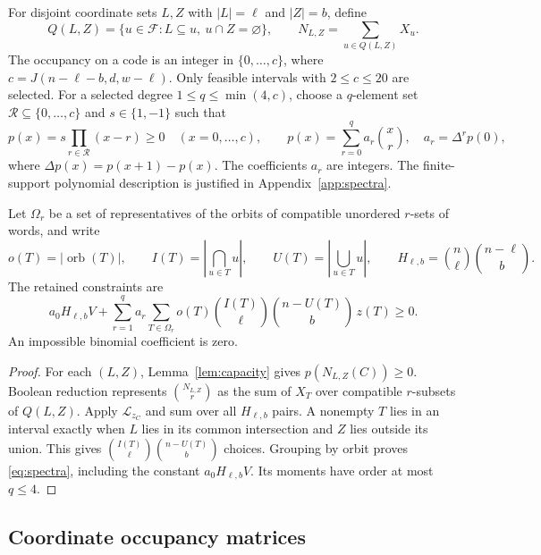 \documentclass[11pt]{article}
\newcommand{\F}{\mathcal F}
\newcommand{\Lzc}{\mathcal L_{z_C}}
\newcommand{\orb}{\operatorname{orb}}
\begin{document}
For disjoint coordinate sets $L,Z$ with $|L|=\ell$ and $|Z|=b$, define
\[
 Q(L,Z)=\{u\in\F:L\subseteq u,\ u\cap Z=\varnothing\},\qquad
 N_{L,Z}=\sum_{u\in Q(L,Z)}X_u.
\]
The occupancy on a code is an integer in $\{0,\ldots,c\}$, where
$c=J(n-\ell-b,d,w-\ell)$. Only feasible intervals with $2\le c\le20$ are
selected. For a selected degree $1\le q\le\min(4,c)$, choose a $q$-element
set $\mathcal R\subseteq\{0,\ldots,c\}$ and $s\in\{1,-1\}$ such that
\begin{equation}\label{eq:spectral-polynomial}
 p(x)=s\prod_{r\in\mathcal R}(x-r)\ge0\quad(x=0,\ldots,c),\qquad
 p(x)=\sum_{r=0}^q a_r\binom xr,\quad a_r=\Delta^rp(0),
\end{equation}
where $\Delta p(x)=p(x+1)-p(x)$. The coefficients $a_r$ are integers.
The finite-support polynomial description is justified in
Appendix~\ref{app:spectra}.

Let $\Omega_r$ be a set of representatives of the orbits of compatible
unordered $r$-sets of words, and write
\[
 o(T)=|\orb(T)|,\qquad I(T)=\left|\bigcap_{u\in T}u\right|,\qquad
 U(T)=\left|\bigcup_{u\in T}u\right|,\qquad
 H_{\ell,b}=\binom n\ell\binom{n-\ell}b.
\]
The retained constraints are
\begin{equation}\label{eq:spectra}
 a_0H_{\ell,b}V+
 \sum_{r=1}^q a_r\sum_{T\in\Omega_r}
 o(T)\binom{I(T)}\ell\binom{n-U(T)}b\,z(T)\ge0.
\end{equation}
An impossible binomial coefficient is zero.

\begin{proof}
For each $(L,Z)$, Lemma~\ref{lem:capacity} gives $p(N_{L,Z}(C))\ge0$.
Boolean reduction represents $\binom{N_{L,Z}}r$ as the sum of $X_T$ over
compatible $r$-subsets of $Q(L,Z)$. Apply $\Lzc$ and sum over all
$H_{\ell,b}$ pairs. A nonempty $T$ lies in an interval exactly when $L$ lies
in its common intersection and $Z$ lies outside its union. This gives
$\binom{I(T)}\ell\binom{n-U(T)}b$ choices. Grouping by orbit proves
\eqref{eq:spectra}, including the constant $a_0H_{\ell,b}V$.
Its moments have order at most $q\le4$.
\end{proof}

\subsection{Coordinate occupancy matrices}\label{subsec:occupancy}
\end{document}
